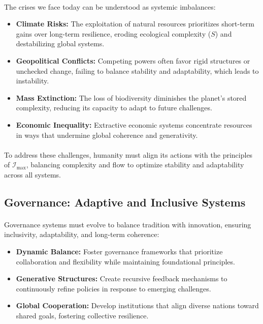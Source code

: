 \documentclass[12pt]{article}
\begin{document}
\paragraph{}
The crises we face today can be understood as systemic imbalances:
\begin{itemize}
    \item \textbf{Climate Risks:} The exploitation of natural resources prioritizes short-term gains over long-term resilience, eroding ecological complexity (\(S\)) and destabilizing global systems.
    \item \textbf{Geopolitical Conflicts:} Competing powers often favor rigid structures or unchecked change, failing to balance stability and adaptability, which leads to instability.
    \item \textbf{Mass Extinction:} The loss of biodiversity diminishes the planet’s stored complexity, reducing its capacity to adapt to future challenges.
    \item \textbf{Economic Inequality:} Extractive economic systems concentrate resources in ways that undermine global coherence and generativity.
\end{itemize}

\paragraph{}
To address these challenges, humanity must align its actions with the principles of \(\mathcal{I}_{\text{max}}\), balancing complexity and flow to optimize stability and adaptability across all systems.

\subsection{Governance: Adaptive and Inclusive Systems}
\paragraph{}
Governance systems must evolve to balance tradition with innovation, ensuring inclusivity, adaptability, and long-term coherence:
\begin{itemize}
    \item \textbf{Dynamic Balance:} Foster governance frameworks that prioritize collaboration and flexibility while maintaining foundational principles.
    \item \textbf{Generative Structures:} Create recursive feedback mechanisms to continuously refine policies in response to emerging challenges.
    \item \textbf{Global Cooperation:} Develop institutions that align diverse nations toward shared goals, fostering collective resilience.
\end{itemize}
\end{document}
